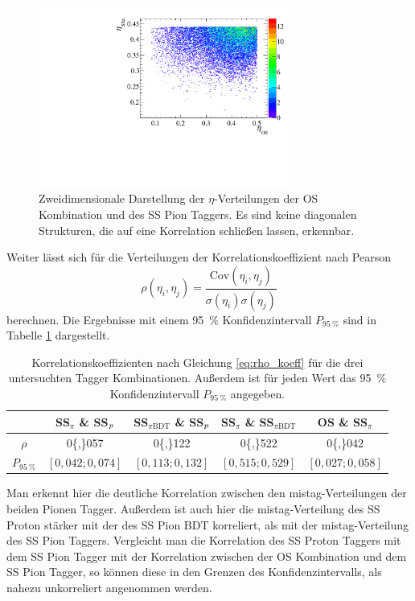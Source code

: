 \begin{figure}[htbp]
	\centering
		\includegraphics[width=0.75\textwidth]{fig/SSpi_OS.pdf}
	\caption{Zweidimensionale Darstellung der $\eta$-Verteilungen der OS Kombination und des SS Pion Taggers. Es sind keine diagonalen Strukturen, die auf eine Korrelation schließen lassen, erkennbar.}
	\label{fig:SSpi_OS} 
\end{figure}
Weiter lässt sich für die Verteilungen der Korrelationskoeffizient nach Pearson \cite{Blobel}
\begin{equation}
\rho(\eta_i,\eta_j)=\frac{\text{Cov}(\eta_i,\eta_j)}{\sigma(\eta_i)\sigma(\eta_j)}\label{eq:rho_koeff}
\end{equation}
berechnen. Die Ergebnisse mit einem \SI{95}{\%} Konfidenzintervall $P_{\SI{95}{\%}}$ sind in Tabelle \ref{tab:pearson_coeff} dargestellt.
\begin{table}[htbp]
	\centering
	\caption{Korrelationskoeffizienten nach Gleichung \eqref{eq:rho_koeff} für die drei untersuchten Tagger Kombinationen. Außerdem ist für jeden Wert das \SI{95}{\%} Konfidenzintervall $P_{\SI{95}{\%}}$ angegeben.}
	\label{tab:pearson_coeff}
	\begin{tabular}{ccccc}
	\toprule
         			& SS$_\pi$ \& SS$_{p}$ & SS$_{\pi\text{BDT}}$ \& SS$_{p}$ & SS$_\pi$ \& SS$_{\pi\text{BDT}}$ & OS \& SS$_\pi$ \\ 
			\midrule
       $\rho$		& \num{0{,}057} & \num{0{,}122} & \num{0{,}522} & \num{0{,}042} \\ 
       $P_{\SI{95}{\%}}$  & $[0{,}042;0{,}074]$ & $[0{,}113;0{,}132]$ & $[0{,}515;0{,}529]$ & $[0{,}027;0{,}058]$  \\ 
       \bottomrule
	\end{tabular}
\end{table}
Man erkennt hier die deutliche Korrelation zwischen den mistag-Verteilungen der beiden Pionen Tagger. Außerdem ist auch hier die mistag-Verteilung des SS Proton stärker mit der des SS Pion BDT korreliert, als mit der mistag-Verteilung des SS Pion Taggers. Vergleicht man die Korrelation des SS Proton Taggers mit dem SS Pion Tagger mit der Korrelation zwischen der OS Kombination und dem SS Pion Tagger, so können diese in den Grenzen des Konfidenzintervalls, als nahezu unkorreliert angenommen werden.

